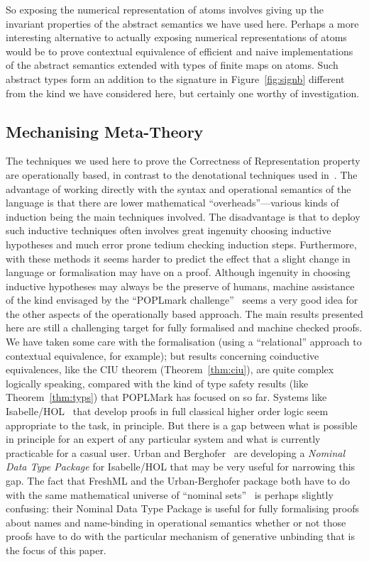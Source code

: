 \documentclass{LMCS}
\theoremstyle{plain}
\theoremstyle{definition}
\begin{document}
So exposing the numerical representation of atoms involves giving up
the invariant properties of the abstract semantics we have used here.
Perhaps a more interesting alternative to actually
exposing numerical representations of atoms would be to prove
contextual equivalence of efficient and naive implementations of the
abstract semantics extended with types of finite maps on atoms.  Such
abstract types form an addition to the signature in
Figure~\ref{fig:signb} different from the kind we have considered
here, but certainly one worthy of investigation.

\subsection{Mechanising Meta-Theory}

The techniques we used here to prove the Correctness of Representation
property are operationally based, in contrast to the denotational
techniques used in~\cite{ShinwellMR:freafp,PittsAM:monsf}. The
advantage of working directly with the syntax and operational
semantics of the language is that there are lower mathematical
``overheads''---various kinds of induction being the main techniques
involved. The disadvantage is that to deploy such inductive techniques
often involves great ingenuity choosing inductive hypotheses and much
error prone tedium checking induction steps. Furthermore, with these
methods it seems harder to predict the effect that a slight change in
language or formalisation may have on a proof. Although ingenuity in
choosing inductive hypotheses may always be the preserve of humans,
machine assistance of the kind envisaged by the ``POPLmark
challenge''~\cite{PierceBP:mecmmp} seems a very good idea for the
other aspects of the operationally based approach.  The main results
presented here are still a challenging target for fully formalised and
machine checked proofs. We have taken some care with the formalisation
(using a ``relational'' approach to contextual equivalence, for
example); but results concerning coinductive equivalences, like the
CIU theorem (Theorem~\ref{thm:ciu}), are quite complex logically
speaking, compared with the kind of type safety results (like
Theorem~\ref{thm:typs}) that POPLMark has focused on so far.  Systems
like Isabelle/HOL~\cite{NipkowT:isahpa} that develop proofs in full
classical higher order logic seem appropriate to the task, in
principle. But there is a gap between what is possible in principle
for an expert of any particular system and what is currently
practicable for a casual user. Urban and
Berghofer~\cite{UrbanC:reccnd} are developing a \emph{Nominal Data
  Type Package} for Isabelle/HOL that may be very useful for narrowing
this gap. The fact that FreshML and the Urban-Berghofer package both
have to do with the same mathematical universe of ``nominal
sets''~\cite{PittsAM:alpsri} is perhaps slightly confusing: their
Nominal Data Type Package is useful for fully formalising proofs about
names and name-binding in operational semantics whether or not those
proofs have to do with the particular mechanism of generative
unbinding that is the focus of this paper.
\end{document}
